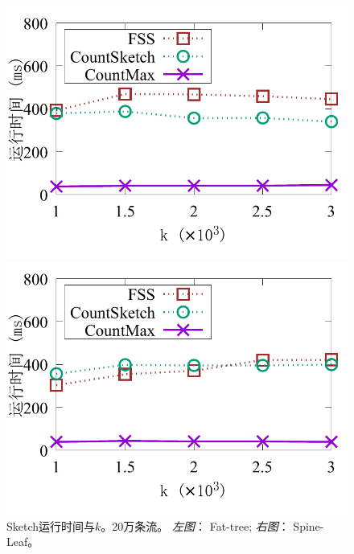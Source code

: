 \begin{figure}[ht]
	\centering
	\begin{minipage}[t]{0.49\linewidth}
		\centering
		\includegraphics[width=\linewidth]{fig/ft_k_time_200000.pdf}
	\end{minipage}\vspace{-0.6em}%
	\begin{minipage}[t]{0.49\linewidth}
		\centering
		\includegraphics[width=\linewidth]{fig/hy_k_time_200000.pdf}
	\end{minipage}\vspace{-0.6em}
	\caption{\textnormal{Sketch运行时间与$k$。20万条流。 \textit{左图}： Fat-tree; \textit{右图}： Spine-Leaf。}}
	\label{fig:time,k}
\end{figure}

